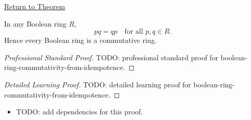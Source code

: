 \newpage
{}
\label{prf:boolean-ring-commutativity-from-idempotence}

\begin{remark*}[Return]
\hyperref[prop:boolean-ring-commutativity-from-idempotence]{Return to Theorem}
\end{remark*}

\begin{proposition*}
In any Boolean ring $R$,
\[
  pq=qp \quad \text{for all } p,q\in R.
\]
Hence every Boolean ring is a commutative ring.
\end{proposition*}

\begin{proof}[Professional Standard Proof]
\LRAProofBodyStart
TODO: professional standard proof for boolean-ring-commutativity-from-idempotence.
\end{proof}

\begin{proof}[Detailed Learning Proof]
\LRAProofBodyStart
TODO: detailed learning proof for boolean-ring-commutativity-from-idempotence.
\end{proof}

\begin{remark*}
\end{remark*}

\begin{dependencies}
\begin{itemize}
  \item TODO: add dependencies for this proof.
\end{itemize}
\end{dependencies}

\clearpage
